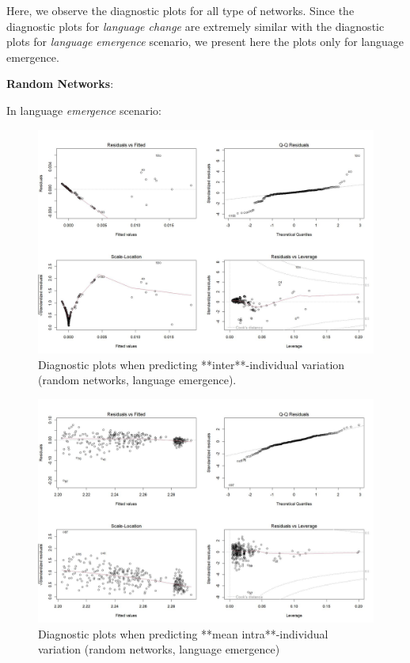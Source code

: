 \documentclass[
]{article}
\begin{document}
Here, we observe the diagnostic plots for all type of networks. Since
the diagnostic plots for \emph{language change} are extremely similar
with the diagnostic plots for \emph{language emergence} scenario, we
present here the plots only for language emergence.

\textbf{Random Networks}:

In language \emph{emergence} scenario:

\begin{figure}[!H]

{\centering \includegraphics{./Figures/unnamed-chunk-124-1} 

}

\caption{Diagnostic plots when predicting **inter**-individual variation (random networks, language emergence).}\label{fig:unnamed-chunk-124}
\end{figure}

\begin{figure}[!H]

{\centering \includegraphics{./Figures/unnamed-chunk-125-1} 

}

\caption{Diagnostic plots when predicting **mean intra**-individual variation (random networks, language emergence)}\label{fig:unnamed-chunk-125}
\end{figure}
\end{document}

